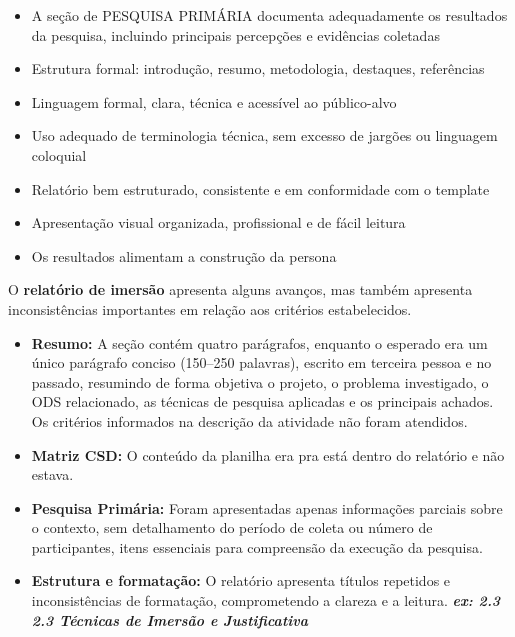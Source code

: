 \documentclass[
  sigconf,
  nonacm, %
  language=portuguese
]{acmart}
\begin{document}
\begin{itemize}[leftmargin=14pt,itemsep=1pt,topsep=3pt,parsep=0pt]
  \item[\textcolor{cgood}{$\checkmark$}] {\small\textcolor{cgood}{A seção de PESQUISA PRIMÁRIA documenta adequadamente os resultados da pesquisa, incluindo principais percepções e evidências coletadas}}
  \item[\textcolor{cgood}{$\checkmark$}] {\small\textcolor{cgood}{Estrutura formal: introdução, resumo, metodologia, destaques, referências}}
  \item[\textcolor{cgood}{$\checkmark$}] {\small\textcolor{cgood}{Linguagem formal, clara, técnica e acessível ao público-alvo}}
  \item[\textcolor{cgood}{$\checkmark$}] {\small\textcolor{cgood}{Uso adequado de terminologia técnica, sem excesso de jargões ou linguagem coloquial}}
  \item[$\square$] {\small\textcolor{cmuted}{Relatório bem estruturado, consistente e em conformidade com o template}}
  \item[\textcolor{cgood}{$\checkmark$}] {\small\textcolor{cgood}{Apresentação visual organizada, profissional e de fácil leitura}}
  \item[\textcolor{cgood}{$\checkmark$}] {\small\textcolor{cgood}{Os resultados alimentam a construção da persona}}
\end{itemize}

O \textbf{relatório de imersão} apresenta alguns avanços, mas também apresenta inconsistências importantes em relação aos critérios estabelecidos.

\begin{itemize}[leftmargin=14pt,itemsep=2pt,topsep=4pt]
  \item \textbf{Resumo:} A seção contém quatro parágrafos, enquanto o esperado era um único parágrafo conciso (150–250 palavras), escrito em terceira pessoa e no passado, resumindo de forma objetiva o projeto, o problema investigado, o ODS relacionado, as técnicas de pesquisa aplicadas e os principais achados. Os critérios informados na descrição da atividade não foram atendidos.
  \item \textbf{Matriz CSD:} O conteúdo da planilha era pra está dentro do relatório e não estava.
  \item \textbf{Pesquisa Primária:} Foram apresentadas apenas informações parciais sobre o contexto, sem detalhamento do período de coleta ou número de participantes, itens essenciais para compreensão da execução da pesquisa.
  \item \textbf{Estrutura e formatação:} O relatório apresenta títulos repetidos e inconsistências de formatação, comprometendo a clareza e a leitura. \textbf{\textit{ex: 2.3 2.3 Técnicas de Imersão e Justificativa}}
\end{itemize}
\end{document}
